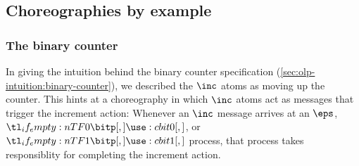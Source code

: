 \documentclass[
  class=../hdeyoung-proposal,
  crop=false
]{standalone}
\begin{document}
\subsection{Choreographies by example}\label{sec:chor-by-example}

\subsubsection{The binary counter}\label{sec:chor-example-counter}

In giving the intuition behind the binary counter specification (\cref{sec:olp-intuition:binary-counter}), we described the $\inc$ atoms %
as moving up the counter.
This hints at a choreography in which $\inc$ atoms act as messages that trigger the increment action:
Whenever an $\inc$ message arrives at an $\eps$, $\bit{0}$, or $\bit{1}$ process, that process takes responsiblity for completing the increment action.


\end{document}
